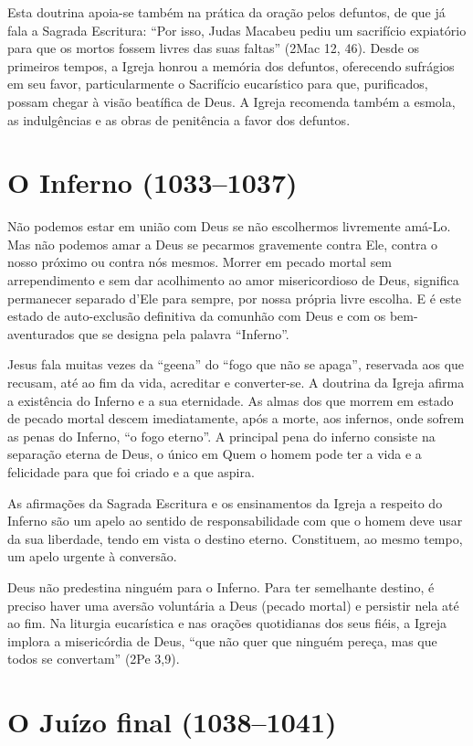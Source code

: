 Esta doutrina apoia-se também na prática da oração pelos defuntos, de que já fala a Sagrada Escritura: ``Por isso, Judas Macabeu pediu um sacrifício expiatório para que os mortos fossem livres das suas faltas'' (2Mac 12, 46). Desde os primeiros tempos, a Igreja honrou a memória dos defuntos, oferecendo sufrágios em seu favor, particularmente o Sacrifício eucarístico para que, purificados, possam chegar à visão beatífica de Deus. A Igreja recomenda também a esmola, as indulgências e as obras de penitência a favor dos defuntos.

\section{O Inferno (1033--1037)}

Não podemos estar em união com Deus se não escolhermos livremente amá-Lo. Mas não podemos amar a Deus se pecarmos gravemente contra Ele, contra o nosso próximo ou contra nós mesmos. Morrer em pecado mortal sem arrependimento e sem dar acolhimento ao amor misericordioso de Deus, significa permanecer separado d'Ele para sempre, por nossa própria livre escolha. E é este estado de auto-exclusão definitiva da comunhão com Deus e com os bem-aventurados que se designa pela palavra ``Inferno''.

Jesus fala muitas vezes da ``geena'' do ``fogo que não se apaga'', reservada aos que recusam, até ao fim da vida, acreditar e converter-se. A doutrina da Igreja afirma a existência do Inferno e a sua eternidade. As almas dos que morrem em estado de pecado mortal descem imediatamente, após a morte, aos infernos, onde sofrem as penas do Inferno, ``o fogo eterno''. A principal pena do inferno consiste na separação eterna de Deus, o único em Quem o homem pode ter a vida e a felicidade para que foi criado e a que aspira.

As afirmações da Sagrada Escritura e os ensinamentos da Igreja a respeito do Inferno são um apelo ao sentido de responsabilidade com que o homem deve usar da sua liberdade, tendo em vista o destino eterno. Constituem, ao mesmo tempo, um apelo urgente à conversão.

Deus não predestina ninguém para o Inferno. Para ter semelhante destino, é preciso haver uma aversão voluntária a Deus (pecado mortal) e persistir nela até ao fim. Na liturgia eucarística e nas orações quotidianas dos seus fiéis, a Igreja implora a misericórdia de Deus, ``que não quer que ninguém pereça, mas que todos se convertam'' (2Pe 3,9).

\section{O Juízo final (1038--1041)}

